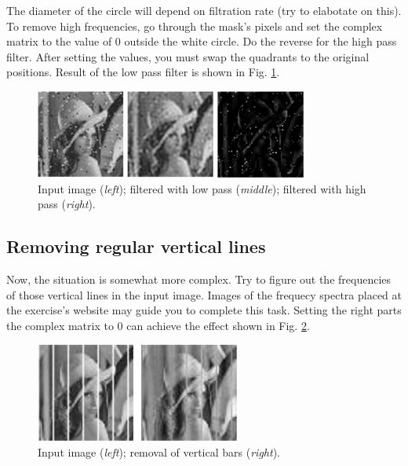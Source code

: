 \documentclass[12pt]{article}
\begin{document}
The diameter of the circle will depend on filtration rate (try to elabotate on this).
To remove high frequencies, go through the mask's pixels and set the complex matrix to the value of 0 outside the white circle.
Do the reverse for the high pass filter.
After setting the values, you must swap the quadrants to the original positions.
Result of the low pass filter is shown in Fig. \ref{fig:low_high}.

\begin{figure}[h]
\centering
\includegraphics[width=0.8\textwidth]{images/lena_low_high.png}
\caption{Input image (\textit{left}); filtered with low pass (\textit{middle}); filtered with high pass (\textit{right}).}
\label{fig:low_high}
\end{figure}


\subsection*{Removing regular vertical lines}

Now, the situation is somewhat more complex.
Try to figure out the frequencies of those vertical lines in the input image.
Images of the frequecy spectra placed at the exercise's website may guide you to complete this task.
Setting the right parts the complex matrix to 0 can achieve the effect shown in Fig. \ref{fig:lena_bars_example}.

\begin{figure}[h]
\centering
\includegraphics[width=0.6\textwidth]{images/lena_bars_example.png}
\caption{Input image (\textit{left}); removal of vertical bars (\textit{right}).}
\label{fig:lena_bars_example}
\end{figure}


\end{document}
